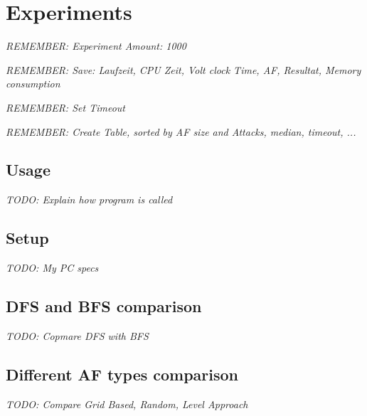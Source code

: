 \chapter{Experiments}
\textit{REMEMBER: Experiment Amount: 1000}

\noindent
\textit{REMEMBER: Save:  Laufzeit, CPU Zeit, Volt clock Time, AF, Resultat, Memory consumption}

\noindent
\textit{REMEMBER: Set Timeout}

\noindent
\textit{REMEMBER: Create Table, sorted by AF size and Attacks, median, timeout, ...}

\section{Usage}
\textit{TODO: Explain how program is called}

\section{Setup}
\textit{TODO: My PC specs}

\section{DFS and BFS comparison}
\textit{TODO: Copmare DFS with BFS}

\section{Different AF types comparison}
\textit{TODO: Compare Grid Based, Random, Level Approach}
